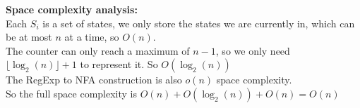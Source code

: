 \documentclass[a4paper,addpoints
	]{exam}
\begin{document}
\begin{solutionbox}{}
    \vspace{1em}

    \noindent\textbf{\large Space complexity analysis:} \\
    Each $S_i$ is a set of states, we only store the states we are currently in, which can be at most $n$ at a time, so $O(n).$ \\
    The counter can only reach a maximum of $n-1$, so we only need $\lfloor \log_2(n) \rfloor + 1$ to represent it. So $O(\log_2(n))$ \\ 
    The RegExp to NFA construction is also $o(n)$ space complexity. \\ 
    So the full space complexity is $O(n) + O(\log_2(n)) + O(n) = O(n)$
\end{solutionbox}
\end{document}
